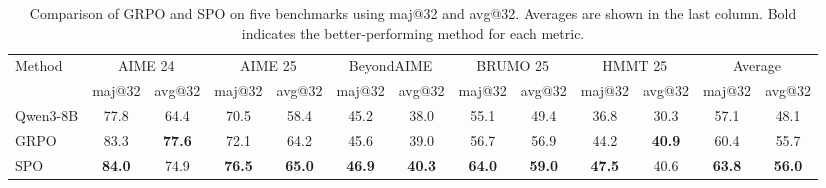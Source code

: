 \begin{table}[h!]
\centering
\caption{Comparison of GRPO and SPO on five benchmarks using maj@32 and avg@32. Averages are shown in the last column. Bold indicates the better-performing method for each metric.}
\label{tab:main_results}
\begin{adjustbox}{max width=\textwidth}
\begin{tabular}{lcccccccccccc}
\toprule
\multirow{2}{*}{Method} 
& \multicolumn{2}{c}{AIME 24} 
& \multicolumn{2}{c}{AIME 25} 
& \multicolumn{2}{c}{BeyondAIME} 
& \multicolumn{2}{c}{BRUMO 25} 
& \multicolumn{2}{c}{HMMT 25} 
& \multicolumn{2}{c}{Average} \\
\cmidrule(lr){2-3}
\cmidrule(lr){4-5}
\cmidrule(lr){6-7}
\cmidrule(lr){8-9}
\cmidrule(lr){10-11}
\cmidrule(lr){12-13}
 & maj@32 & avg@32 
 & maj@32 & avg@32 
 & maj@32 & avg@32 
 & maj@32 & avg@32 
 & maj@32 & avg@32 
 & maj@32 & avg@32 \\
\midrule
Qwen3-8B & 77.8 & 64.4 & 70.5 & 58.4 & 45.2 & 38.0 & 55.1 & 49.4 & 36.8 & 30.3 & 57.1 & 48.1 \\
GRPO & 83.3 & \textbf{77.6} & 72.1 & 64.2 & 45.6 & 39.0 & 56.7 & 56.9 & 44.2 & \textbf{40.9} & 60.4 & 55.7 \\
SPO  & \textbf{84.0} & 74.9 & \textbf{76.5} & \textbf{65.0} & \textbf{46.9} & \textbf{40.3} & \textbf{64.0} & \textbf{59.0} & \textbf{47.5} & 40.6 & \textbf{63.8} & \textbf{56.0} \\
\bottomrule
\end{tabular}
\end{adjustbox}
\end{table}




